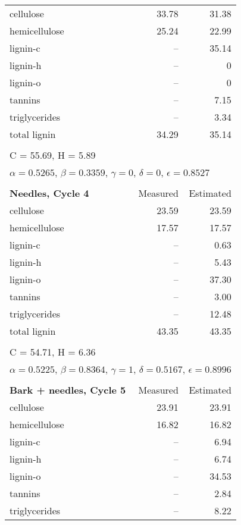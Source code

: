 \begin{longtable}{p{8cm}rr}
    \midrule
    cellulose     & 33.78 & 31.38 \\
    hemicellulose & 25.24 & 22.99 \\
    lignin-c      & --    & 35.14 \\
    lignin-h      & --    & 0 \\
    lignin-o      & --    & 0 \\
    tannins       & --    & 7.15 \\
    triglycerides & --    & 3.34 \\
    total lignin  & 34.29 & 35.14 \\
    \\
    \multicolumn{3}{l}{C = 55.69, H = 5.89} \\
    \multicolumn{3}{l}{$\alpha = 0.5265$, $\beta = 0.3359$, $\gamma = 0$, $\delta = 0$, $\epsilon = 0.8527$} \\
    \\
    \textbf{Needles, Cycle 4} & Measured & Estimated \\
    \midrule
    cellulose     & 23.59 & 23.59 \\
    hemicellulose & 17.57 & 17.57 \\
    lignin-c      & --    & 0.63 \\
    lignin-h      & --    & 5.43 \\
    lignin-o      & --    & 37.30 \\
    tannins       & --    & 3.00 \\
    triglycerides & --    & 12.48 \\
    total lignin  & 43.35 & 43.35 \\
    \\
    \multicolumn{3}{l}{C = 54.71, H = 6.36} \\
    \multicolumn{3}{l}{$\alpha = 0.5225$, $\beta = 0.8364$, $\gamma = 1$, $\delta = 0.5167$, $\epsilon = 0.8996$} \\
    \\
    \textbf{Bark + needles, Cycle 5} & Measured & Estimated \\
    \midrule
    cellulose     & 23.91 & 23.91 \\
    hemicellulose & 16.82 & 16.82 \\
    lignin-c      & --    & 6.94 \\
    lignin-h      & --    & 6.74 \\
    lignin-o      & --    & 34.53 \\
    tannins       & --    & 2.84 \\
    triglycerides & --    & 8.22 \\

\end{longtable}
